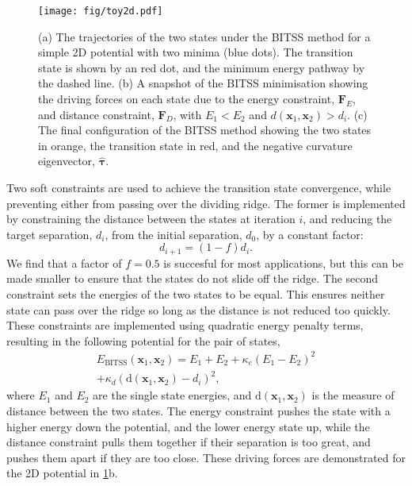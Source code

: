 \documentclass[aps,prl,twocolumn,groupedaddress]{revtex4}
\begin{document}
\begin{figure}[htb]
  \texttt{[image: fig/toy2d.pdf]}
  \caption{\label{fig:toy2d}
    (a) The trajectories of the two states under the BITSS method for a simple 2D potential with two minima (blue dots).
        The transition state is shown by an red dot, and the minimum energy pathway by the dashed line.
    (b) A snapshot of the BITSS minimisation showing the driving forces on each state due to the energy constraint, $\bm{F}_E$, and distance constraint, $\bm{F}_D$, with $E_1 < E_2$ and $d(\bm{x}_1,\bm{x}_2) > d_i$.
    (c) The final configuration of the BITSS method showing the two states in orange, the transition state in red, and the negative curvature eigenvector, $\bm{\hat{\tau}}$.
  }
\end{figure}

\topic Two soft constraints are used to achieve the transition state convergence, while preventing either from passing over the dividing ridge.
The former is implemented by constraining the distance between the states at iteration $i$, and reducing the target separation, $d_i$, from the initial separation, $d_0$, by a constant factor:
\begin{equation}\label{eq:diteration}
  d_{i+1} = (1 - f) d_i.
\end{equation}
We find that a factor of $f = 0.5$ is succesful for most applications, but this can be made smaller to ensure that the states do not slide off the ridge.
The second constraint sets the energies of the two states to be equal.
This ensures neither state can pass over the ridge so long as the distance is not reduced too quickly.
These constraints are implemented using quadratic energy penalty terms, resulting in the following potential for the pair of states,
\begin{multline}\label{eq:bitss}
  E_\text{BITSS}(\bm{x}_1, \bm{x}_2) = E_1 + E_2
    + \kappa_e \left( E_1 - E_2 \right) ^2 \\
    + \kappa_d \left( \mathrm{d}(\bm{x}_1, \bm{x}_2) - d_i \right) ^2,
\end{multline}
where $E_1$ and $E_2$ are the single state energies, and $\mathrm{d}(\bm{x}_1, \bm{x}_2)$ is the measure of distance between the two states.
The energy constraint pushes the state with a higher energy down the potential, and the lower energy state up, while the distance constraint pulls them together if their separation is too great, and pushes them apart if they are too close.
These driving forces are demonstrated for the 2D potential in \cref{fig:toy2d}b.
\end{document}
